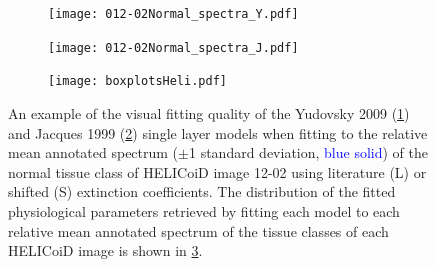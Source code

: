 \begin{figure}[h!]
    \centering
    \begin{subfigure}{0.49\textwidth}
        \texttt{[image: 012-02Normal\_spectra\_Y.pdf]}
        \caption{}
        \label{fig:backwardsHSIHeliY}
    \end{subfigure}
    \begin{subfigure}{0.49\textwidth}
        \texttt{[image: 012-02Normal\_spectra\_J.pdf]}
        \caption{}
        \label{fig:backwardsHSIHeliJ}
    \end{subfigure}
    \begin{subfigure}{\textwidth}
        \texttt{[image: boxplotsHeli.pdf]}
        \caption{}
        \label{fig:boxplotsHeli}
    \end{subfigure}
    \caption{An example of the visual fitting quality of the Yudovsky 2009 (\ref{fig:backwardsHSIHeliY}) and Jacques 1999 (\ref{fig:backwardsHSIHeliJ}) single layer models when fitting to the relative mean annotated spectrum ($\pm$1 standard deviation, \textcolor{blue}{blue solid}) of the normal tissue class of HELICoiD image 12-02 using literature (L) or shifted (S) extinction coefficients. The distribution of the fitted physiological parameters retrieved by fitting each model to each relative mean annotated spectrum of the tissue classes of each HELICoiD image is shown in \ref{fig:boxplotsHeli}.}
    \label{fig:HELICoiDann}
\end{figure}

